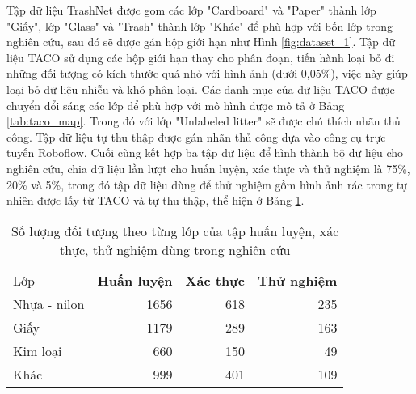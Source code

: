 \documentclass[../the.tex]{subfiles}
\begin{document}
{\fontsize{13}{12} \selectfont

Tập dữ liệu TrashNet được gom các lớp "Cardboard" và "Paper" thành lớp "Giấy", lớp "Glass" và "Trash" thành lớp "Khác" để phù hợp với bốn lớp trong nghiên cứu, sau đó sẽ được gán hộp giới hạn như Hình \ref{fig:dataset_1}.
Tập dữ liệu TACO sử dụng các hộp giới hạn thay cho phân đoạn, tiến hành loại bỏ đi những đối tượng có kích thước quá nhỏ với hình ảnh (dưới 0,05\%), việc này giúp loại bỏ dữ liệu nhiễu và khó phân loại.
Các danh mục của dữ liệu TACO được chuyển đổi sáng các lớp để phù hợp với mô hình được mô tả ở Bảng  \ref{tab:taco_map}.
Trong đó với lớp "Unlabeled litter" sẽ được chú thích nhãn thủ công.
Tập dữ liệu tự thu thập được gán nhãn thủ công dựa vào công cụ trực tuyến Roboflow.
Cuối cùng kết hợp ba tập dữ liệu để hình thành bộ dữ liệu cho nghiên cứu, chia dữ liệu lần lượt cho huấn luyện, xác thực và thử nghiệm là 75\%, 20\% và 5\%, trong đó tập dữ liệu dùng để thử nghiệm gồm hình ảnh rác trong tự nhiên được lấy từ TACO và tự thu thập, thể hiện ở Bảng \ref{tab:datasettest}.

}


\begin{table}[!h]
	\centering
	\begin{threeparttable}
		\caption{Số lượng đối tượng theo từng lớp của tập huấn luyện, xác thực, thử nghiệm dùng trong nghiên cứu}
		\begin{tabular}{lrrr}
			\cline{1-4}
			Lớp          & \textbf{Huấn luyện} & \textbf{Xác thực} & \textbf{Thử nghiệm} \\ \cline{1-4}
			Nhựa - nilon & 1656                & 618               & 235                 \\ \cline{1-4}
			Giấy         & 1179                & 289               & 163                 \\ \cline{1-4}
			Kim loại   & 660                 & 150               & 49                  \\ \cline{1-4}
			Khác         & 999                 & 401               & 109                 \\ \cline{1-4}
		\end{tabular}
	\label{tab:datasettest}
	\end{threeparttable}
\end{table}
\end{document}
